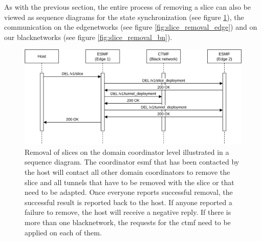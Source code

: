 As with the previous section, the entire process of removing a slice can also be viewed as sequence diagrams for the state synchronization (see figure \ref{fig:slice_removal_synchronization}), the communication on the \gls{edgenetwork}s (see figure \ref{fig:slice_removal_edge}) and on our \gls{blacknetwork}s (see figure \ref{fig:slice_removal_bn}).

\begin{figure}[H]
    \centering
    \includegraphics[width=\linewidth]{images/chapter_6/slice_removal_coordination.png}
    \caption[Slice removal on the coordinators]{Removal of slices on the domain coordinator level illustrated in a sequence diagram. The coordinator \acrshort{esmf} that has been contacted by the host will contact all other domain coordinators to remove the slice and all tunnels that have to be removed with the slice or that need to be adapted. Once everyone reports successful removal, the successful result is reported back to the host. If anyone reported a failure to remove, the host will receive a negative reply. If there is more than one \gls{blacknetwork}, the requests for the \acrshort{ctmf} need to be applied on each of them.}
    \label{fig:slice_removal_synchronization}
\end{figure}
